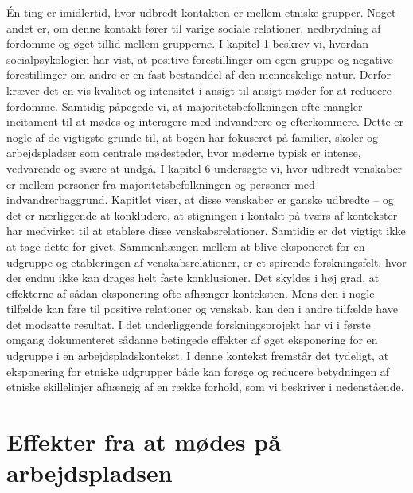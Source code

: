 \documentclass[
]{book}
\begin{document}
Én ting er imidlertid, hvor udbredt kontakten er mellem etniske grupper. Noget andet er, om denne kontakt fører til varige sociale relationer, nedbrydning af fordomme og øget tillid mellem grupperne. I \hyperref[kap1]{kapitel 1} beskrev vi, hvordan socialpsykologien har vist, at positive forestillinger om egen gruppe og negative forestillinger om andre er en fast bestanddel af den menneskelige natur. Derfor kræver det en vis kvalitet og intensitet i ansigt-til-ansigt møder for at reducere fordomme. Samtidig påpegede vi, at majoritetsbefolkningen ofte mangler incitament til at mødes og interagere med indvandrere og efterkommere. Dette er nogle af de vigtigste grunde til, at bogen har fokuseret på familier, skoler og arbejdspladser som centrale mødesteder, hvor møderne typisk er intense, vedvarende og svære at undgå. I \hyperref[kap6]{kapitel 6} undersøgte vi, hvor udbredt venskaber er mellem personer fra majoritetsbefolkningen og personer med indvandrerbaggrund. Kapitlet viser, at disse venskaber er ganske udbredte -- og det er nærliggende at konkludere, at stigningen i kontakt på tværs af kontekster har medvirket til at etablere disse venskabsrelationer. Samtidig er det vigtigt ikke at tage dette for givet. Sammenhængen mellem at blive eksponeret for en udgruppe og etableringen af venskabsrelationer, er et spirende forskningsfelt, hvor der endnu ikke kan drages helt faste konklusioner. Det skyldes i høj grad, at effekterne af sådan eksponering ofte afhænger konteksten. Mens den i nogle tilfælde kan føre til positive relationer og venskab, kan den i andre tilfælde have det modsatte resultat. I det underliggende forskningsprojekt har vi i første omgang dokumenteret sådanne betingede effekter af øget eksponering for en udgruppe i en arbejdspladskontekst. I denne kontekst fremstår det tydeligt, at eksponering for etniske udgrupper både kan forøge og reducere betydningen af etniske skillelinjer afhængig af en række forhold, som vi beskriver i nedenstående.

\section{Effekter fra at mødes på arbejdspladsen}\label{effekter-fra-at-muxf8des-puxe5-arbejdspladsen}
\end{document}
